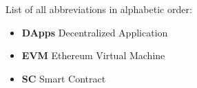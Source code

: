 
List of all abbreviations in alphabetic order:

\begin{itemize}
    \item \textbf{DApps} Decentralized Application
    \item \textbf{EVM} Ethereum Virtual Machine
    \item \textbf{SC} Smart Contract
\end{itemize}